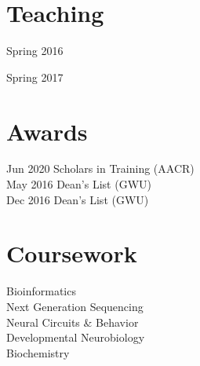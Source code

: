 
\newpage %

\begin{minipage}[t]{0.32\textwidth} %
\sectionspace
\section{Teaching}
\vspace{\topsep} %
\begin{tightitemize}
\item Spring 2016
\item Spring 2017
\end{tightitemize}

\section{Awards} 
Jun 2020 Scholars in Training (AACR)\\
May 2016 Dean's List (GWU) \\
Dec 2016 Dean's List (GWU) \\


\section{Coursework}
Bioinformatics \\
Next Generation Sequencing \\
Neural Circuits \& Behavior \\
Developmental Neurobiology \\
Biochemistry \\

\end{minipage} %
\hfill
